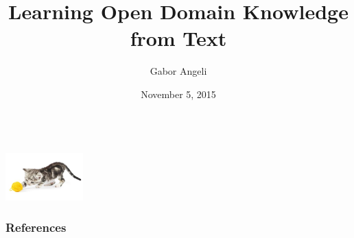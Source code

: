 \documentclass[hyperref]{beamer}
\title[Learning Knowledge From Text]{Learning Open Domain Knowledge from Text}
\subtitle{}
\author{Gabor Angeli}
\date{November 5, 2015}
\institute[Stanford]{Stanford University}
\begin{document}
\begin{frame}[noframenumbering]
  \titlepage
\end{frame}







\begin{frame}{}
\begin{center}
   \\
  \vspace{1cm}
  \includegraphics[width=3cm]{../img/yarn-cat.jpg} \\
\end{center}
\end{frame}



\begin{frame}[allowframebreaks]
  \frametitle{References}
  
  
\end{frame}
\end{document}

